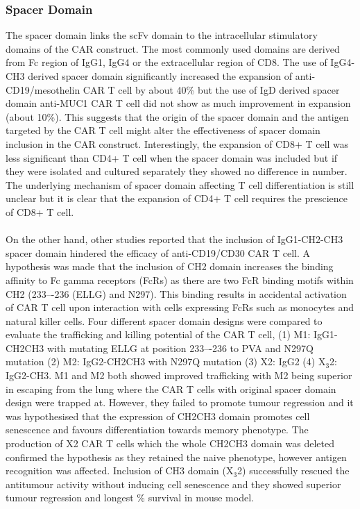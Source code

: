 \documentclass[12pt,oneside]{report}
\begin{document}
\subsubsection{Spacer Domain} 
The spacer domain links the scFv domain to the intracellular stimulatory domains of the CAR construct. The most commonly used domains are derived from Fc region of IgG1, IgG4 or the extracellular region of CD8\citep{hinge}. The use of IgG4-CH3 derived spacer domain significantly increased the expansion of anti-CD19/mesothelin CAR T cell by about 40\%\citep{hinge} but the use of IgD derived spacer domain anti-MUC1 CAR T cell did not show as much improvement in expansion (about 10\%)\citep{hinge}. This suggests that the origin of the spacer domain and the antigen targeted by the CAR T cell might alter the effectiveness of spacer domain inclusion in the CAR construct. Interestingly, the expansion of CD8+ T cell was less significant than CD4+ T cell when the spacer domain was included\citep{hinge} but if they were isolated and cultured separately they showed no difference in number. The underlying mechanism of spacer domain affecting T cell differentiation is still unclear but it is clear that the expansion of CD4+ T cell requires the prescience of CD8+ T cell. 
\\\\On the other hand, other studies reported that the inclusion of IgG1-CH2-CH3 spacer domain hindered the efficacy of anti-CD19\citep{hinge-2}/CD30\citep{hinge-3} CAR T cell. A hypothesis was made that the inclusion of CH2 domain increases the binding affinity to Fc gamma receptors (Fc\textgamma Rs) as there are two Fc\textgamma R binding motifs within CH2 (233–-236 (ELLG) and N297). This binding results in accidental activation of CAR T cell upon interaction with cells expressing Fc\textgamma Rs such as monocytes and natural killer cells\citep{hinge-3}. Four different spacer domain designs were compared\citep{hinge-7} to evaluate the trafficking and killing potential of the CAR T cell, (1) M1: IgG1-CH2CH3 with mutating ELLG at position 233–-236 to PVA and N297Q mutation (2) M2: IgG2-CH2CH3 with N297Q mutation (3) X2: IgG2 (4) X$_{3}$2: IgG2-CH3. M1 and M2 both showed improved trafficking with M2 being superior in escaping from the lung\citep{hinge-7} where the CAR T cells with original spacer domain design were trapped at. However, they failed to promote tumour regression and it was hypothesised that the expression of CH2CH3 domain promotes cell senescence and favours differentiation towards memory phenotype. The production of X2 CAR T cells which the whole CH2CH3 domain was deleted confirmed the hypothesis as they retained the naive phenotype, however antigen recognition was affected\citep{hinge-7}. Inclusion of CH3 domain (X$_{3}$2) successfully rescued the antitumour activity without inducing cell senescence and they showed superior tumour regression and longest \% survival in mouse model\citep{hinge-7}. 
\end{document}
